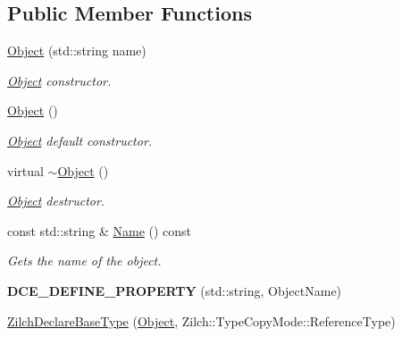 \subsection*{Public Member Functions}
\begin{DoxyCompactItemize}
\item 
\hyperlink{classDCEngine_1_1Object_ac6002055baad6ab2dc43ca670668f4b7}{Object} (std\-::string name)
\begin{DoxyCompactList}\small\item\em \hyperlink{classDCEngine_1_1Object}{Object} constructor. \end{DoxyCompactList}\item 
\hyperlink{classDCEngine_1_1Object_a30c2d1f2116c6f0848664c3505a30f31}{Object} ()
\begin{DoxyCompactList}\small\item\em \hyperlink{classDCEngine_1_1Object}{Object} default constructor. \end{DoxyCompactList}\item 
\hypertarget{classDCEngine_1_1Object_a12a6bef854e9c4b0ed2ff0f4a3f8f20c}{virtual \hyperlink{classDCEngine_1_1Object_a12a6bef854e9c4b0ed2ff0f4a3f8f20c}{$\sim$\-Object} ()}\label{classDCEngine_1_1Object_a12a6bef854e9c4b0ed2ff0f4a3f8f20c}

\begin{DoxyCompactList}\small\item\em \hyperlink{classDCEngine_1_1Object}{Object} destructor. \end{DoxyCompactList}\item 
const std\-::string \& \hyperlink{classDCEngine_1_1Object_a474672403702b7f6e243714062dead0a}{Name} () const 
\begin{DoxyCompactList}\small\item\em Gets the name of the object. \end{DoxyCompactList}\item 
\hypertarget{classDCEngine_1_1Object_a18f9c54dcf7df310b21872325221cde3}{{\bfseries D\-C\-E\-\_\-\-D\-E\-F\-I\-N\-E\-\_\-\-P\-R\-O\-P\-E\-R\-T\-Y} (std\-::string, Object\-Name)}\label{classDCEngine_1_1Object_a18f9c54dcf7df310b21872325221cde3}

\item 
\hypertarget{classDCEngine_1_1Object_a968c0a3ff6323416a9649b4b4d97ae4f}{\hyperlink{classDCEngine_1_1Object_a968c0a3ff6323416a9649b4b4d97ae4f}{Zilch\-Declare\-Base\-Type} (\hyperlink{classDCEngine_1_1Object}{Object}, Zilch\-::\-Type\-Copy\-Mode\-::\-Reference\-Type)}\label{classDCEngine_1_1Object_a968c0a3ff6323416a9649b4b4d97ae4f}


\end{DoxyCompactItemize}
